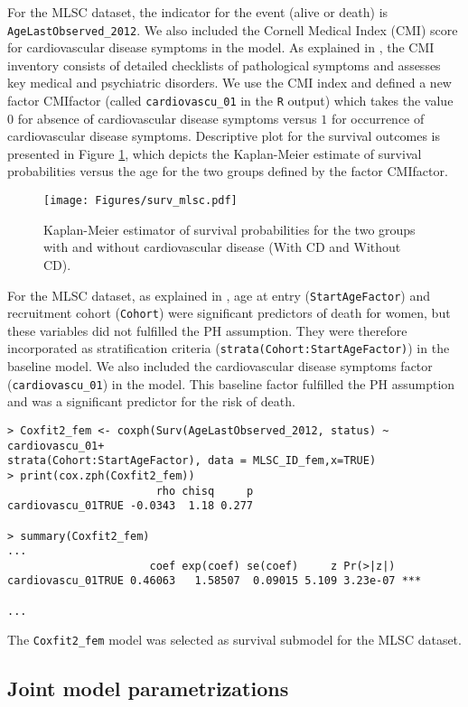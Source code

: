 \documentclass[12pt]{article}
\begin{document}
For the MLSC dataset, the indicator for the event (alive or death) is \texttt{AgeLastObserved\_2012}. We also included the Cornell Medical Index (CMI) score for cardiovascular disease symptoms in the model. As explained in \cite{aichele2015life}, the CMI inventory consists of detailed checklists of pathological symptoms and assesses key medical and psychiatric disorders. We use the CMI index and defined a new factor CMIfactor (called \texttt{cardiovascu\_01} in the \texttt{R} output) which takes the value $0$ for absence of cardiovascular disease symptoms versus $1$ for occurrence of cardiovascular disease symptoms.
Descriptive plot for the survival outcomes is presented in Figure \ref{KM_MLSC}, which depicts the Kaplan-Meier estimate of survival probabilities versus the age for the two groups defined by the factor CMIfactor.
\begin{figure}[!tb]
\centering
\texttt{[image: Figures/surv\_mlsc.pdf]}
\caption{Kaplan-Meier estimator of survival probabilities for the two groups with and without cardiovascular disease (With CD and Without CD).}
\label{KM_MLSC}
\end{figure}
For the MLSC dataset, as explained in \cite{aichele2015life}, age at entry (\texttt{StartAgeFactor}) and recruitment cohort (\texttt{Cohort}) were significant predictors of death for women, but these variables did not fulfilled the PH assumption. They were therefore incorporated as stratification criteria (\texttt{strata(Cohort:StartAgeFactor)}) in the baseline model.
We also included the cardiovascular disease symptoms factor (\texttt{cardiovascu\_01}) in the model. This baseline factor fulfilled the PH assumption and was a significant predictor for the risk of death.
\begin{verbatim}
> Coxfit2_fem <- coxph(Surv(AgeLastObserved_2012, status) ~ cardiovascu_01+
strata(Cohort:StartAgeFactor), data = MLSC_ID_fem,x=TRUE)
> print(cox.zph(Coxfit2_fem))
                       rho chisq     p
cardiovascu_01TRUE -0.0343  1.18 0.277

> summary(Coxfit2_fem)
...
                      coef exp(coef) se(coef)     z Pr(>|z|)
cardiovascu_01TRUE 0.46063   1.58507  0.09015 5.109 3.23e-07 ***

...
\end{verbatim}
The \texttt{Coxfit2\_fem} model was selected as survival submodel for the MLSC dataset.

\subsection{Joint model parametrizations}
\label{Joint model parametrizations}
\end{document}
